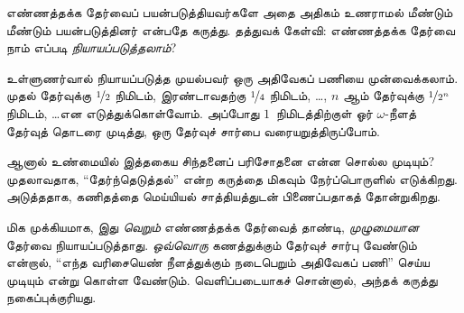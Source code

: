 \documentclass[../../../include/open-logic-section]{subfiles}
\begin{document}
எண்ணத்தக்க தேர்வைப் பயன்படுத்தியவர்களே அதை அதிகம்
உணராமல் மீண்டும் மீண்டும் பயன்படுத்தினர் என்பதே கருத்து.
தத்துவக் கேள்வி: எண்ணத்தக்க தேர்வை நாம் எப்படி
\emph{நியாயப்படுத்தலாம்}?

உள்ளுணர்வால் நியாயப்படுத்த முயல்பவர் ஒரு அதிவேகப் பணியை
முன்வைக்கலாம். முதல் தேர்வுக்கு $\nicefrac{1}{2}$ நிமிடம்,
இரண்டாவதற்கு $\nicefrac{1}{4}$ நிமிடம், \dots,
$n$ ஆம் தேர்வுக்கு $\nicefrac{1}{2^n}$ நிமிடம்,
\dots\@ என எடுத்துக்கொள்வோம். அப்போது $1$~நிமிடத்திற்குள்
ஓர் $\omega$-நீளத் தேர்வுத் தொடரை முடித்து, ஒரு தேர்வுச்
சார்பை வரையறுத்திருப்போம்.

ஆனால் உண்மையில் இத்தகைய சிந்தனைப் பரிசோதனை என்ன
சொல்ல முடியும்? முதலாவதாக, ``தேர்ந்தெடுத்தல்'' என்ற கருத்தை
மிகவும் நேர்ப்பொருளில் எடுக்கிறது. அடுத்ததாக, கணிதத்தை
மெய்யியல் சாத்தியத்துடன் பிணைப்பதாகத் தோன்றுகிறது.

மிக முக்கியமாக, இது \emph{வெறும்} எண்ணத்தக்க தேர்வைத்
தாண்டி, \emph{முழுமையான} தேர்வை நியாயப்படுத்தாது. \emph{ஒவ்வொரு}
கணத்துக்கும் தேர்வுச் சார்பு வேண்டும் என்றால்,
``எந்த வரிசையெண் நீளத்துக்கும் நடைபெறும் அதிவேகப் பணி''
செய்ய முடியும் என்று கொள்ள வேண்டும். வெளிப்படையாகச்
சொன்னால், அந்தக் கருத்து நகைப்புக்குரியது.
\end{document}
